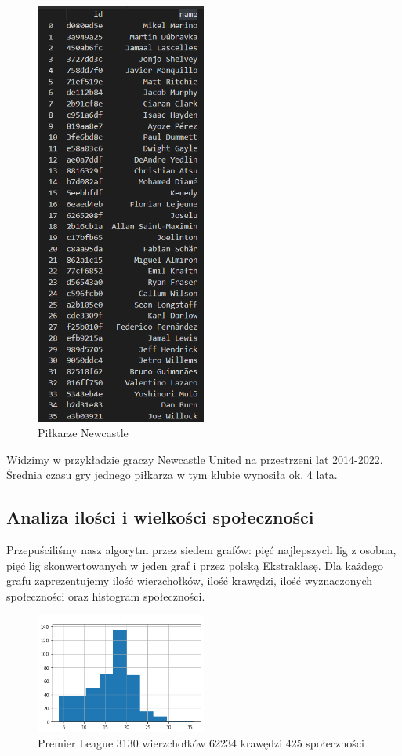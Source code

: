 \documentclass{article}
\begin{document}
\begin{figure}[H]
    \centering
    \includegraphics[width=0.5\textwidth]{images/newcastle.png}
    \caption{Piłkarze Newcastle}
    \label{fig:my_label}
\end{figure}

Widzimy w przykładzie graczy Newcastle United na przestrzeni lat 2014-2022. Średnia czasu gry jednego piłkarza w tym klubie wynosiła ok. 4 lata.

\subsection{Analiza ilości i wielkości społeczności}

Przepuściliśmy nasz algorytm przez siedem grafów: pięć najlepszych lig z osobna, pięć lig skonwertowanych w jeden graf i przez polską Ekstraklasę. Dla każdego grafu zaprezentujemy ilość wierzchołków, ilość krawędzi, ilość wyznaczonych społeczności oraz histogram społeczności.

\begin{figure}[H]
    \centering
    \includegraphics[width=0.5\textwidth]{images/hpl.png}
    \caption{Premier League 3130 wierzchołków 62234 krawędzi  425 społeczności}
    \label{fig:my_label}
\end{figure}
\end{document}
